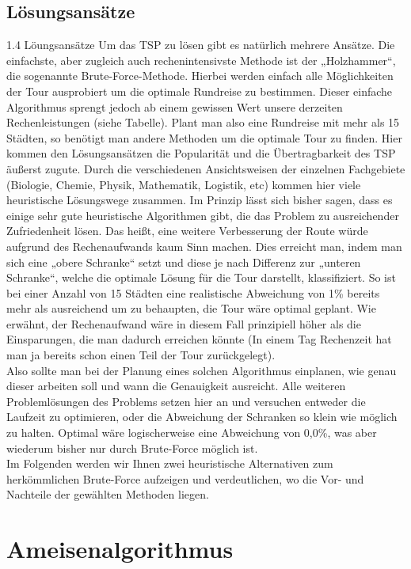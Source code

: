\documentclass[a4paper]{article}
\begin{document}
		\subsection{Lösungsansätze}
		1.4 Löungsansätze
Um das TSP zu lösen gibt es natürlich mehrere Ansätze. Die einfachste, aber zugleich auch rechenintensivste Methode ist der „Holzhammer“, die sogenannte Brute-Force-Methode. Hierbei werden einfach alle Möglichkeiten der Tour ausprobiert um die optimale Rundreise zu bestimmen. Dieser einfache Algorithmus sprengt jedoch ab einem gewissen Wert unsere derzeiten Rechenleistungen (siehe Tabelle).
Plant man also eine Rundreise mit mehr als 15 Städten, so benötigt man andere Methoden um die optimale Tour zu finden. Hier kommen den Lösungsansätzen die Popularität und die Übertragbarkeit des TSP äußerst zugute. Durch die verschiedenen Ansichtsweisen der einzelnen Fachgebiete (Biologie, Chemie, Physik, Mathematik, Logistik, etc) kommen hier viele heuristische Lösungswege zusammen.
Im Prinzip lässt sich bisher sagen, dass es einige sehr gute heuristische Algorithmen gibt, die das Problem zu ausreichender Zufriedenheit lösen. Das heißt, eine weitere Verbesserung der Route würde aufgrund des Rechenaufwands kaum Sinn machen. Dies erreicht man, indem man sich eine „obere Schranke“ setzt und diese je nach Differenz zur „unteren Schranke“, welche die optimale Lösung für die Tour darstellt, klassifiziert. So ist bei einer Anzahl von 15 Städten eine realistische Abweichung von 1\% bereits mehr als ausreichend um zu behaupten, die Tour wäre optimal geplant. Wie erwähnt, der Rechenaufwand wäre in diesem Fall prinzipiell höher als die Einsparungen, die man dadurch erreichen könnte (In einem Tag Rechenzeit hat man ja bereits schon einen Teil der Tour zurückgelegt).\\
Also sollte man bei der Planung eines solchen Algorithmus einplanen, wie genau dieser arbeiten soll und wann die Genauigkeit ausreicht. Alle weiteren Problemlösungen des Problems setzen hier an und versuchen entweder die Laufzeit zu optimieren, oder die Abweichung der Schranken so klein wie möglich zu halten. Optimal wäre logischerweise eine Abweichung von 0,0\%, was aber wiederum bisher nur  durch Brute-Force möglich ist.
\\

Im Folgenden werden wir Ihnen zwei heuristische Alternativen zum herkömmlichen Brute-Force aufzeigen und verdeutlichen, wo die Vor- und Nachteile der gewählten Methoden liegen.
\newpage
		
		\section{Ameisenalgorithmus}
		
\end{document}
